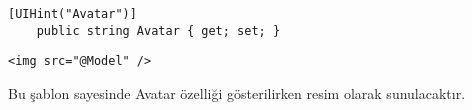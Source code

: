 \documentclass[10pt,a4paper]{article}
\begin{document}
\begin{lstlisting}[label=code-UIHintOrnek1,caption=UIHint Örnek1]
	[UIHint("Avatar")]
	public string Avatar { get; set; }
\end{lstlisting}


\begin{lstlisting}[label=code-UIHintOrnek cshtml,caption=UIHint cshtml]
	<img src="@Model" />
\end{lstlisting}

Bu şablon sayesinde Avatar özelliği gösterilirken resim olarak sunulacaktır.






% 

\end{document}
